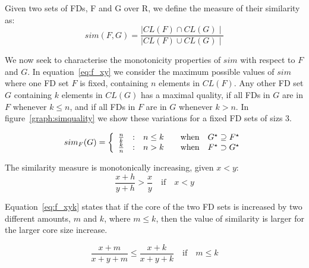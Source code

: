 \begin{definition}
\begin{rm}
Given two sets of FDs, F and G over R, we define the measure of
their similarity as:
\begin{displaymath}
sim(F, G) = \frac{\mid CL(F) \cap CL(G) \mid}{\mid CL(F) \cup CL(G) \mid }
\end{displaymath}
\end{rm}
\end{definition}

We now seek to characterise the monotonicity properties of $sim$ with respect
to $F$ and $G$. In equation~\ref{eq:f_xy} we consider the maximum
possible values of $sim$ where one FD set $F$ is fixed, containing $n$
elements in $CL(F)$. Any other FD set $G$
containing $k$ elements in $CL(G)$ has a maximal quality, 
if all FDs in $G$ are in $F$
whenever $k \le n$, and if all FDs in $F$ are in $G$ whenever $k > n$.
In figure~\ref{graph:simquality} we show 
these variations for a fixed FD sets of sizs 3.

\begin{equation}\label{eq:f_xy}
sim_F(G) = \left\{ \begin{array}
		{l@{\quad:\quad}ll}
\frac{n}{k} & n \le k & \quad\mbox{when}\quad G^\star \supseteq F^\star\\
\frac{k}{n} & n > k   & \quad\mbox{when}\quad F^\star \supset G^\star\\
			\end{array}	\right.
\end{equation}

The similarity measure is monotonically increasing, given $x < y$:
\begin{equation}\label{eq:mon}
\frac{x + h}{y + h} > \frac{x}{y} \quad\mbox{if}\quad x < y
\end{equation}

Equation~\ref{eq:f_xyk} states that if the core of the two FD sets is
increased by two different amounts, $m$ and $k$, where $m \le k$, then
the value of similarity is larger for the larger core size increase.

\begin{equation}\label{eq:f_xyk}
\frac{x + m}{x + y + m} \le \frac{x+ k}{x + y + k} \quad\mbox{if}\quad m \le k
\end{equation}

